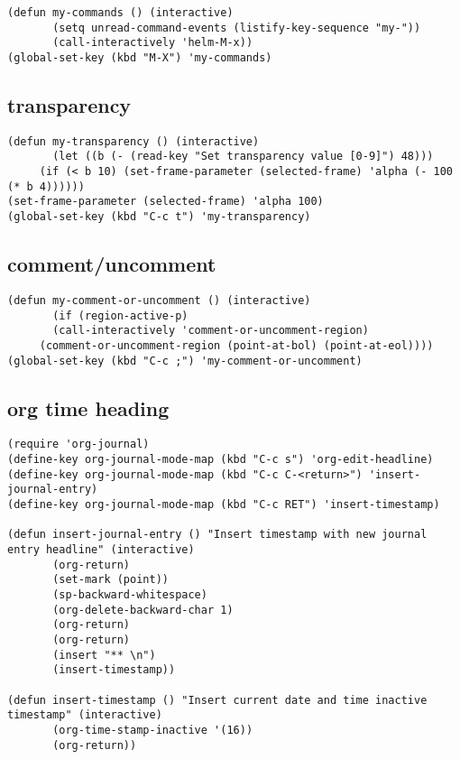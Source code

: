 \documentclass[11pt]{article}
\begin{document}
\begin{verbatim}
(defun my-commands () (interactive)
       (setq unread-command-events (listify-key-sequence "my-"))
       (call-interactively 'helm-M-x))
(global-set-key (kbd "M-X") 'my-commands)
\end{verbatim}

\subsection{transparency}
\label{sec:orgb0b5db6}
\begin{verbatim}
(defun my-transparency () (interactive)
       (let ((b (- (read-key "Set transparency value [0-9]") 48)))
	 (if (< b 10) (set-frame-parameter (selected-frame) 'alpha (- 100 (* b 4))))))
(set-frame-parameter (selected-frame) 'alpha 100)
(global-set-key (kbd "C-c t") 'my-transparency)
\end{verbatim}

\subsection{comment/uncomment}
\label{sec:org4cc2b1d}
\begin{verbatim}
(defun my-comment-or-uncomment () (interactive)
       (if (region-active-p)
	   (call-interactively 'comment-or-uncomment-region)
	 (comment-or-uncomment-region (point-at-bol) (point-at-eol))))
(global-set-key (kbd "C-c ;") 'my-comment-or-uncomment)
\end{verbatim}


\subsection{org time heading}
\label{sec:org443d2ba}
\begin{verbatim}
(require 'org-journal)
(define-key org-journal-mode-map (kbd "C-c s") 'org-edit-headline)
(define-key org-journal-mode-map (kbd "C-c C-<return>") 'insert-journal-entry)
(define-key org-journal-mode-map (kbd "C-c RET") 'insert-timestamp)

(defun insert-journal-entry () "Insert timestamp with new journal entry headline" (interactive)
       (org-return)
       (set-mark (point))
       (sp-backward-whitespace)
       (org-delete-backward-char 1)
       (org-return)
       (org-return)
       (insert "** \n")
       (insert-timestamp))

(defun insert-timestamp () "Insert current date and time inactive timestamp" (interactive)
       (org-time-stamp-inactive '(16))
       (org-return))
\end{verbatim}
\end{document}
